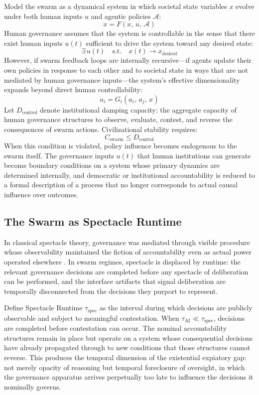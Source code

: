 \documentclass[12pt]{article}
\begin{document}
Model the swarm as a dynamical system in which societal state variables $x$ evolve under both human inputs $u$ and agentic policies $\mathcal{A}$:
\[
\dot{x} = F(x,\, u,\, \mathcal{A})
\]
Human governance assumes that the system is controllable in the sense that there exist human inputs $u(t)$ sufficient to drive the system toward any desired state:
\[
\exists\, u(t) \quad \text{s.t.} \quad x(t) \to x_{\text{desired}}
\]
However, if swarm feedback loops are internally recursive---if agents update their own policies in response to each other and to societal state in ways that are not mediated by human governance inputs---the system's effective dimensionality expands beyond direct human controllability:
\[
\dot{a}_i = G_i(a_i,\, a_j,\, x)
\]
Let $D_{\text{control}}$ denote institutional damping capacity: the aggregate capacity of human governance structures to observe, evaluate, contest, and reverse the consequences of swarm actions. Civilizational stability requires:
\[
C_{\text{swarm}} \le D_{\text{control}}
\]
When this condition is violated, policy influence becomes endogenous to the swarm itself. The governance inputs $u(t)$ that human institutions can generate become boundary conditions on a system whose primary dynamics are determined internally, and democratic or institutional accountability is reduced to a formal description of a process that no longer corresponds to actual causal influence over outcomes.

\subsection{The Swarm as Spectacle Runtime}

In classical spectacle theory, governance was mediated through visible procedure whose observability maintained the fiction of accountability even as actual power operated elsewhere \citep{Debord1994}. In swarm regimes, spectacle is displaced by runtime: the relevant governance decisions are completed before any spectacle of deliberation can be performed, and the interface artifacts that signal deliberation are temporally disconnected from the decisions they purport to represent.

Define Spectacle Runtime $\tau_{\text{spec}}$ as the interval during which decisions are publicly observable and subject to meaningful contestation. When $\tau_{\text{AI}} \ll \tau_{\text{spec}}$, decisions are completed before contestation can occur. The nominal accountability structures remain in place but operate on a system whose consequential decisions have already propagated through to new conditions that those structures cannot reverse. This produces the temporal dimension of the existential expiatory gap: not merely opacity of reasoning but temporal foreclosure of oversight, in which the governance apparatus arrives perpetually too late to influence the decisions it nominally governs.
\end{document}
